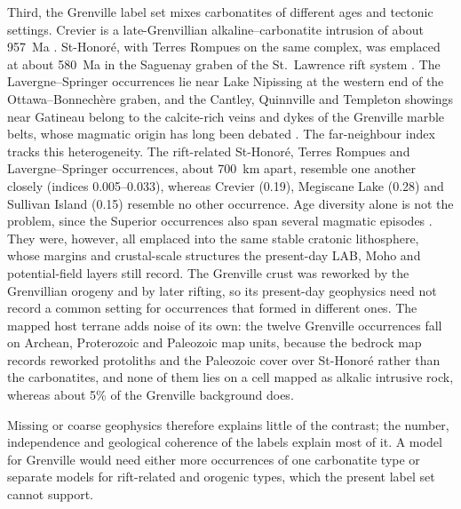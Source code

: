 \documentclass[pdflatex,sn-apa]{sn-jnl}
\begin{document}
Third, the Grenville label set mixes carbonatites of different ages and tectonic settings. Crevier is a late-Grenvillian alkaline--carbonatite intrusion of about 957~Ma \citep{Groulier2020}. St-Honoré, with Terres Rompues on the same complex, was emplaced at about 580~Ma in the Saguenay graben of the St.~Lawrence rift system \citep{Neron2018}. The Lavergne--Springer occurrences lie near Lake Nipissing at the western end of the Ottawa--Bonnech\`ere graben, and the Cantley, Quinnville and Templeton showings near Gatineau belong to the calcite-rich veins and dykes of the Grenville marble belts, whose magmatic origin has long been debated \citep{Moecher1997}. The far-neighbour index tracks this heterogeneity. The rift-related St-Honoré, Terres Rompues and Lavergne--Springer occurrences, about 700~km apart, resemble one another closely (indices 0.005--0.033), whereas Crevier (0.19), Megiscane Lake (0.28) and Sullivan Island (0.15) resemble no other occurrence. Age diversity alone is not the problem, since the Superior occurrences also span several magmatic episodes \citep{Rukhlov2010}. They were, however, all emplaced into the same stable cratonic lithosphere, whose margins and crustal-scale structures the present-day LAB, Moho and potential-field layers still record. The Grenville crust was reworked by the Grenvillian orogeny and by later rifting, so its present-day geophysics need not record a common setting for occurrences that formed in different ones. The mapped host terrane adds noise of its own: the twelve Grenville occurrences fall on Archean, Proterozoic and Paleozoic map units, because the bedrock map records reworked protoliths and the Paleozoic cover over St-Honoré rather than the carbonatites, and none of them lies on a cell mapped as alkalic intrusive rock, whereas about 5\% of the Grenville background does.

Missing or coarse geophysics therefore explains little of the contrast; the number, independence and geological coherence of the labels explain most of it. A model for Grenville would need either more occurrences of one carbonatite type or separate models for rift-related and orogenic types, which the present label set cannot support.
\end{document}
